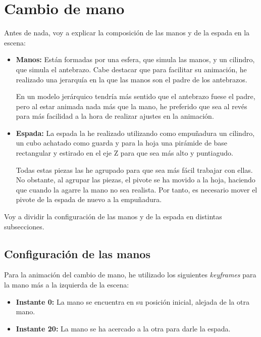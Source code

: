 
\section{Cambio de mano}

Antes de nada, voy a explicar la composición de las manos y de la espada en la escena:

\begin{itemize}
    \item \textbf{Manos: }Están formadas por una esfera, que simula las manos, y un cilindro, que simula el antebrazo. Cabe destacar que para facilitar su animación, he realizado una jerarquía en la que las manos son el padre de los antebrazos.
    
    En un modelo jerárquico tendría más sentido que el antebrazo fuese el padre, pero al estar animada nada más que la mano, he preferido que sea al revés para más facilidad a la hora de realizar ajustes en la animación.
    
    \item \textbf{Espada: }La espada la he realizado utilizando como empuñadura un cilindro, un cubo achatado como guarda y para la hoja una pirámide de base rectangular y estirado en el eje Z para que sea más alto y puntiagudo.
    
    \bigskip

    Todas estas piezas las he agrupado para que sea más fácil trabajar con ellas. No obstante, al agrupar las piezas, el pivote se ha movido a la hoja, haciendo que cuando la agarre la mano no sea realista. Por tanto, es necesario mover el pivote de la espada de nuevo a la empuñadura.
    
\end{itemize}

Voy a dividir la configuración de las manos y de la espada en distintas subsecciones.

\subsection{Configuración de las manos}

Para la animación del cambio de mano, he utilizado los siguientes \textit{keyframes} para la mano más a la izquierda de la escena:

\begin{itemize}
    \item \textbf{Instante 0: }La mano se encuentra en su posición inicial, alejada de la otra mano.
    \item \textbf{Instante 20: }La mano se ha acercado a la otra para darle la espada.
\end{itemize}

